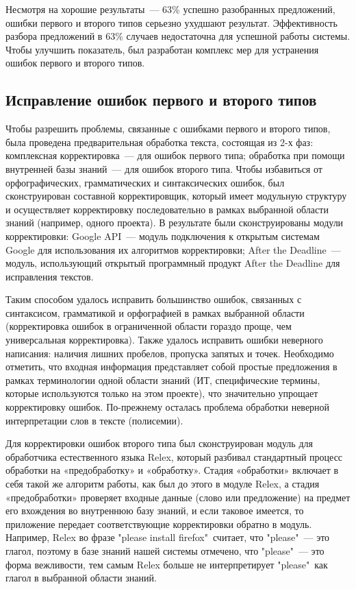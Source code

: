 Несмотря на хорошие результаты~--- 63\% успешно разобранных предложений, ошибки первого и второго типов серьезно ухудшают результат. Эффективность разбора предложений в 63\% случаев недостаточна для успешной работы системы. Чтобы улучшить показатель, был разработан комплекс мер для устранения ошибок первого и второго типов.
	
 
\subsection{Исправление ошибок первого и второго типов} \label{sect2_2}
Чтобы разрешить проблемы, связанные с ошибками первого и второго типов, была проведена предварительная обработка текста, состоящая из 2-х фаз: комплексная корректировка~--- для ошибок первого типа; обработка при помощи внутренней базы знаний~--- для ошибок второго типа. 
Чтобы избавиться от орфографических, грамматических и синтаксических ошибок, был сконструирован составной корректировщик, который имеет модульную структуру и осуществляет корректировку последовательно в рамках выбранной области знаний (например, одного проекта). В результате были сконструированы модули корректировки: Google API~--- модуль подключения к открытым системам Google для использования их алгоритмов корректировки; After the Deadline~--- модуль, использующий открытый программный продукт After the Deadline для исправления текстов. 

Таким способом удалось исправить большинство ошибок, связанных с синтаксисом, грамматикой и орфографией в рамках выбранной области (корректировка ошибок в ограниченной области гораздо проще, чем универсальная корректировка). Также удалось исправить ошибки неверного написания: наличия лишних пробелов, пропуска запятых и точек. Необходимо отметить, что входная информация представляет собой простые предложения в рамках терминологии одной области знаний (ИТ, специфические термины, которые используются только на этом проекте), что значительно упрощает корректировку ошибок. По-прежнему осталась проблема обработки неверной интерпретации слов в тексте (полисемии). \par

Для корректировки ошибок второго типа был сконструирован модуль для обработчика естественного языка Relex, который разбивал стандартный процесс обработки на «предобработку» и «обработку». Стадия «обработки» включает в себя такой же алгоритм работы, как был до этого в модуле Relex, а стадия «предобработки» проверяет входные данные (слово или предложение) на предмет его вхождения во внутреннюю базу знаний, и если таковое имеется, то приложение передает соответствующие корректировки обратно в модуль. Например, Relex во фразе "please install firefox"\ считает, что "please"\ --- это глагол, поэтому в базе знаний нашей системы отмечено, что "please"\ --- это форма вежливости, тем самым Relex больше не интерпретирует "please"\ как глагол в выбранной области знаний.


